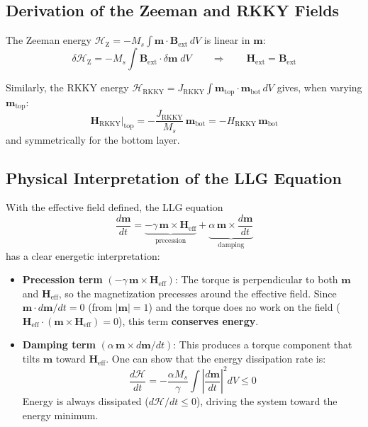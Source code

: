 \documentclass[11pt,a4paper]{article}
\newcommand{\mb}[1]{\mathbf{#1}}
\newcommand{\Heff}{\mb{H}_{\text{eff}}}
\newcommand{\Hrkky}{\mb{H}_{\text{RKKY}}}
\newcommand{\Hext}{\mb{H}_{\text{ext}}}
\newcommand{\Ms}{M_s}
\begin{document}
\subsection{Derivation of the Zeeman and RKKY Fields}

The Zeeman energy
$\mathcal{H}_{\text{Z}} = -\Ms \int \mb{m} \cdot
\mb{B}_{\text{ext}} \, dV$ is linear in $\mb{m}$:
%
\begin{equation}
\delta\mathcal{H}_{\text{Z}} = -\Ms \int
    \mb{B}_{\text{ext}} \cdot \delta\mb{m} \; dV
\qquad\Longrightarrow\qquad
\Hext = \mb{B}_{\text{ext}}
\end{equation}

Similarly, the RKKY energy
$\mathcal{H}_{\text{RKKY}} = J_{\text{RKKY}} \int
\mb{m}_{\text{top}} \cdot \mb{m}_{\text{bot}} \, dV$ gives,
when varying $\mb{m}_{\text{top}}$:
%
\begin{equation}
\left.\Hrkky\right|_{\text{top}} =
    -\frac{J_{\text{RKKY}}}{\Ms}\,\mb{m}_{\text{bot}}
    = -H_{\text{RKKY}}\,\mb{m}_{\text{bot}}
\end{equation}
%
and symmetrically for the bottom layer.

\subsection{Physical Interpretation of the LLG Equation}

With the effective field defined, the LLG equation
\begin{equation}
\frac{d\mb{m}}{dt} =
    \underbrace{-\gamma\,\mb{m} \times \Heff}_{\text{precession}}
    + \underbrace{\alpha\,\mb{m} \times
        \frac{d\mb{m}}{dt}}_{\text{damping}}
\end{equation}
has a clear energetic interpretation:

\begin{itemize}[nosep]
\item \textbf{Precession term}
    $(-\gamma\,\mb{m}\times\Heff)$:
    The torque is perpendicular to both $\mb{m}$ and $\Heff$,
    so the magnetization precesses around the effective field.
    Since $\mb{m} \cdot d\mb{m}/dt = 0$ (from $|\mb{m}|=1$)
    and the torque does no work on the field
    ($\Heff \cdot (\mb{m}\times\Heff) = 0$), this term
    \textbf{conserves energy}.

\item \textbf{Damping term}
    $(\alpha\,\mb{m}\times d\mb{m}/dt)$:
    This produces a torque component that tilts $\mb{m}$ toward
    $\Heff$.  One can show that the energy dissipation rate is:
    \begin{equation}
    \frac{d\mathcal{H}}{dt} =
        -\frac{\alpha\Ms}{\gamma}
        \int \left|\frac{d\mb{m}}{dt}\right|^2 dV
        \leq 0
    \end{equation}
    Energy is always dissipated ($d\mathcal{H}/dt \leq 0$),
    driving the system toward the energy minimum.
\end{itemize}
\end{document}
